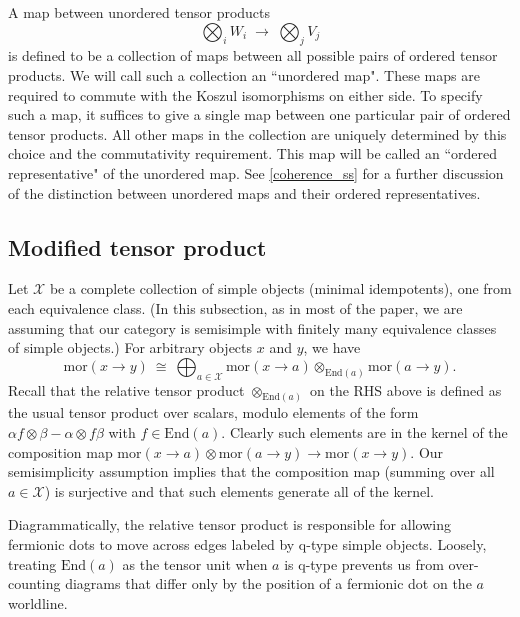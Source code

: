 \documentclass[12pt,a4paper]{article}
\newcommand{\tp}{\otimes}
\newcommand{\mcx}{\mathcal{X}}
\newcommand\be            {\begin{equation}}
\newcommand\ee            {\end{equation}}
\newcommand{\mor}{\text{mor}}
\newcommand{\End}{\text{End}}
\begin{document}
A map between unordered tensor products
\be
	\bigotimes_i W_i \; \to \; \bigotimes_j V_j
\ee
is defined to be a collection of maps between
all possible pairs of ordered tensor products.
We will call such a collection an ``unordered map".
These maps are required to commute with the Koszul isomorphisms on either side.
To specify such a map, it suffices to give a single map between one particular pair of ordered tensor products.
All other maps in the collection are uniquely determined by this choice and the commutativity requirement.
This map will be called an ``ordered representative" of the unordered map.
See \ref{coherence_ss} for a further discussion of the distinction between unordered maps and
their ordered representatives.





\subsection{Modified tensor product} \label{modified_tensor_product}

Let $\mcx$ be a complete collection of simple objects (minimal idempotents), one from each equivalence class.
(In this subsection, as in most of the paper, we are assuming that our category is semisimple with finitely many equivalence
classes of simple objects.)
For arbitrary objects $x$ and $y$, we have
\be \label{sobdecomp}
	\mor(x\to y) \: \cong \: \bigoplus_{a\in\mcx} \mor(x\to a) \tp_{\End(a)} \mor(a\to y) .
\ee
Recall that the relative tensor product $\tp_{\End(a)}$ on the RHS above is defined as the usual tensor product over scalars, modulo elements
of the form $\alpha f \tp \beta - \alpha\tp f\beta$ with $f\in \End(a)$.
Clearly such elements are in the kernel of the composition map $\mor(x\to a) \tp \mor(a\to y) \to \mor(x\to y)$.
Our semisimplicity assumption implies that the composition map (summing over all $a\in \mcx$) is surjective and that such
elements generate all of the kernel.

Diagrammatically, the relative tensor product is responsible for allowing fermionic dots to move across edges labeled by q-type simple objects.
Loosely, treating $\End(a)$ as the tensor unit when $a$ is q-type prevents us from over-counting diagrams that 
differ only by the position of a fermionic dot on the $a$ worldline.  
\end{document}
